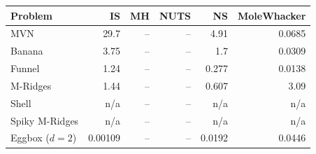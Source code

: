 \begin{tabular}{lrrrrr}
\toprule
Problem & IS & MH & NUTS & NS & MoleWhacker \\
\midrule
MVN & 29.7 & -- & -- & 4.91 & 0.0685 \\
Banana & 3.75 & -- & -- & 1.7 & 0.0309 \\
Funnel & 1.24 & -- & -- & 0.277 & 0.0138 \\
M-Ridges & 1.44 & -- & -- & 0.607 & 3.09 \\
Shell & n/a & -- & -- & n/a & n/a \\
Spiky M-Ridges & n/a & -- & -- & n/a & n/a \\
\midrule
Eggbox ($d=2$) & 0.00109 & -- & -- & 0.0192 & 0.0446 \\
\bottomrule
\end{tabular}
